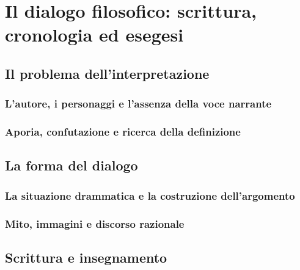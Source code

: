 \chapter{Il dialogo filosofico: scrittura, cronologia ed esegesi}
\label{cap:platone:dialogo}

\section{Il problema dell'interpretazione}

\subsection{L'autore, i personaggi e l'assenza della voce narrante}

\subsection{Aporia, confutazione e ricerca della definizione}

\section{La forma del dialogo}

\subsection{La situazione drammatica e la costruzione dell'argomento}

\subsection{Mito, immagini e discorso razionale}

\section{Scrittura e insegnamento}

